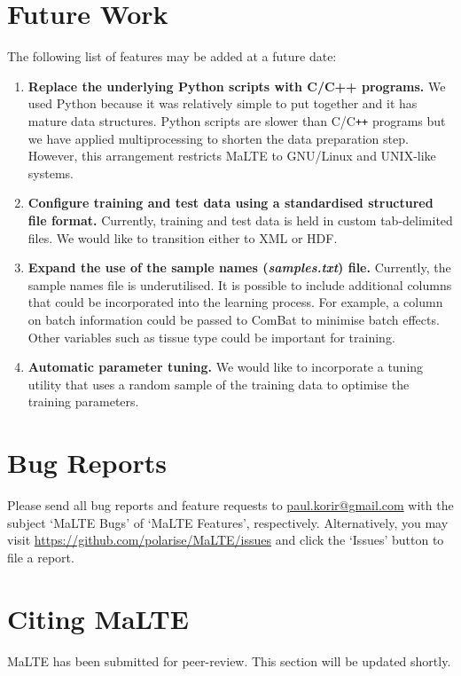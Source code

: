 \documentclass[a4paper,12pt]{article}
\begin{document}
\section{Future Work}
\label{future}
The following list of features may be added at a future date:
\begin{enumerate}
\item \textbf{Replace the underlying \textsf{Python} scripts with C/C++ programs.} We used \textsf{Python} because it was relatively simple to put together and it has mature data structures. \textsf{Python} scripts are slower than \textsf{C/C}\verb!++! programs but we have applied multiprocessing to shorten the data preparation step. However, this arrangement restricts \textsf{MaLTE} to GNU/Linux and UNIX-like systems.
\item \textbf{Configure training and test data using a standardised structured file format.} Currently, training and test data is held in custom tab-delimited files. We would like to transition either to XML or HDF.
\item \textbf{Expand the use of the sample names (\textit{samples.txt}) file.} Currently, the sample names file is underutilised. It is possible to include additional columns that could be incorporated into the learning process. For example, a column on batch information could be passed to \textsf{ComBat} to minimise batch effects. Other variables such as tissue type could be important for training.
\item \textbf{Automatic parameter tuning.} We would like to incorporate a tuning utility that uses a random sample of the training data to optimise the training parameters.
\end{enumerate}

\section{Bug Reports}
\label{bugs}
Please send all bug reports and feature requests to \href{mailto:paul.korir@gmail.com}{paul.korir@gmail.com} with the subject `MaLTE Bugs' of `MaLTE Features', respectively. Alternatively, you may visit \url{https://github.com/polarise/MaLTE/issues} and click the `Issues' button to file a report.

\section{Citing \textsf{MaLTE}}
\textsf{MaLTE} has been submitted for peer-review. This section will be updated shortly.
\end{document}
